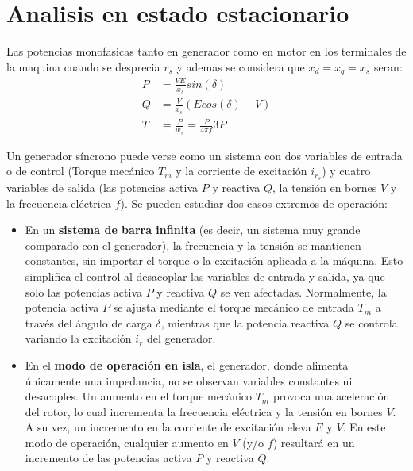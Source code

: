 \documentclass[
  11pt,
  letterpaper,
   addpoints,
   answers
  ]{exam}
\begin{document}
\section*{Analisis en estado estacionario}
Las potencias  monofasicas tanto en generador como en motor en los terminales de la maquina cuando se desprecia $r_{s}$ y ademas se considera que $x_{d}= x_{q} = x_{s}$ seran:
\begin{align}
  P &= \frac{VE}{x_{s}}sin(\delta)\\
  Q &= \frac{V}{x_{s}}(Ecos(\delta) -V)\\
  T &= \frac{P}{w_{s}} = \frac{P}{4\pi f}3P
\end{align}
\begin{figure}[H]
  \begin{center}
    \hspace{0.5cm} %
    \label{Figura-Curvas}
  \end{center}
\end{figure}
Un generador síncrono puede verse como un sistema con dos variables de entrada o de control (Torque mecánico \( T_m \) y la corriente de excitación \( i_{r_s} \)) y cuatro variables de salida (las potencias activa \( P \) y reactiva \( Q \), la tensión en bornes \( V \) y la frecuencia eléctrica \( f \)). Se pueden estudiar dos casos extremos de operación:

\begin{itemize}
    \item En un \textbf{sistema de barra infinita} (es decir, un sistema muy grande comparado con el generador), la frecuencia y la tensión se mantienen constantes, sin importar el torque o la excitación aplicada a la máquina. Esto simplifica el control al desacoplar las variables de entrada y salida, ya que solo las potencias activa \( P \) y reactiva \( Q \) se ven afectadas. Normalmente, la potencia activa \( P \) se ajusta mediante el torque mecánico de entrada \( T_m \) a través del ángulo de carga \( \delta \), mientras que la potencia reactiva \( Q \) se controla variando la excitación \( i_r \) del generador.

    \item En el \textbf{modo de operación en isla}, el generador, donde alimenta únicamente una impedancia, no se observan variables constantes ni desacoples. Un aumento en el torque mecánico \( T_m \) provoca una aceleración del rotor, lo cual incrementa la frecuencia eléctrica y la tensión en bornes \( V \). A su vez, un incremento en la corriente de excitación eleva \( E \) y \( V \). En este modo de operación, cualquier aumento en \( V \) (y/o \( f \)) resultará en un incremento de las potencias activa \( P \) y reactiva \( Q \).
\end{itemize}
\end{document}
